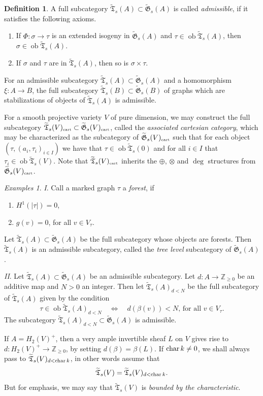 \documentclass[11pt]{amsart}
\theoremstyle{definition}
\newtheorem{defn}[prop]{Definition}
\theoremstyle{remark}
\newtheorem{examples}{Examples}\renewcommand{\theexamples}{}
\renewcommand{\tilde}{\widetilde}
\newcommand{\cart}{{\mbox{\tiny cart}}}
\newcommand{\TT}{{\mathfrak{T}}}
\newcommand{\GG}{{\mathfrak{G}}}
\newcommand{\zz}{{\mathbb{Z}}}
\newcommand{\ob}{\operatorname{ob}}
\newcommand{\chr}{\operatorname{\rm char}\nolimits}
\renewcommand{\t}{_{\tau}}
\theoremstyle{plain}
\theoremstyle{definition}
\theoremstyle{remark}
\begin{document}
\begin{defn} \label{doasvg}
A full subcategory \(\tilde{\TT}_s(A)\subset\tilde{\GG}_s(A)\) is called {\em
admissible}, if it satisfies the following
axioms.
\begin{enumerate}
\item If \(\Phi:\sigma\rightarrow\tau\) is an extended isogeny in
\(\tilde{\GG}_s(A)\) and \(\tau\in \ob\tilde{\TT}_s(A)\),
then \(\sigma\in\ob\tilde{\TT}_s(A)\).
\item If \(\sigma\) and \(\tau\) are in \(\tilde{\TT}_s(A)\), then so is
\(\sigma\times\tau\).
\end{enumerate}
\end{defn}

For an admissible subcategory \(\tilde{\TT}_s(A)\subset\tilde{\GG}_s(A)\) and a
homomorphism \(\xi:A\rightarrow B\), the
full subcategory \(\tilde{\TT}_s(B)\subset\tilde{\GG}_s(B)\) of graphs which are
stabilizations of objects of
\(\tilde{\TT}_s(A)\) is admissible.

For a smooth projective variety \(V\) of pure dimension, we may construct the
full subcategory
\(\tilde{\TT}_s(V)_\cart\subset\tilde{\GG}_s(V)_\cart\), called the {\em
associated cartesian category}, which may be
characterized as the subcategory of \(\tilde{\GG}_s(V)_\cart\) such that for each
object \((\tau,(a_i,\tau_i)_{i\in I})\) we
have that \(\tau\in\ob\tilde{\TT}_s(0)\) and for all \(i\in I\) that
\(\tau_i\in\ob\tilde{\TT}_s(V)\). Note that
\(\tilde{\TT}_s(V)_\cart\) inherits the \(\oplus\), \(\otimes\) and \(\deg\) structures
from \(\tilde{\GG}_s(V)_\cart\).

\begin{examples}
{\em I}. Call a marked graph \(\tau\) a {\em forest}, if
\begin{enumerate}
\item \(H^1(|\tau|)=0\),
\item \(g(v)=0\), for all \(v\in V\t\).
\end{enumerate}
Let \(\tilde{\TT}_s(A)\subset\tilde{\GG}_s(A)\) be the full subcategory whose
objects are forests. Then \(\tilde{\TT}_s(A)\)
is an admissible subcategory, called the {\em tree level }subcategory of
\(\tilde{\GG}_s(A)\).

{\em II}. Let \(\tilde{\TT}_s(A)\subset\tilde{\GG}_s(A)\) be an admissible
subcategory. Let \(d:A\rightarrow\zz_{\geq0}\) be
an additive map and \(N>0\) an integer. Then let \(\tilde{\TT}_s(A)_{d<N}\) be the
full subcategory of \(\tilde{\TT}_s(A)\)
given by the condition
\[
\tau\in\ob\tilde{\TT}_s(A)_{d<N}\quad \Longleftrightarrow\quad
\mbox{\(d(\beta(v))<N\),  for all \(v\in V\t\)}.
\]
The subcategory \(\tilde{\TT}_s(A)_{d<N}\subset\tilde{\GG}_s(A)\) is admissible.

If \(A=H_2(V)^+\), then a very ample invertible sheaf \(L\) on \(V\) gives rise to
\(d:H_2(V)^+\rightarrow\zz_{\geq0}\), by
setting \(d(\beta)=\beta(L)\). If \(\chr k\not=0\), we shall always pass to
\(\tilde{\TT}_s(V)_{d<\chr k}\), in other words
assume that
\[
\tilde{\TT}_s(V)=\tilde{\TT}_s(V)_{d<\chr k}.
\]
But for emphasis, we may say that \(\tilde{\TT}_s(V)\) is {\em bounded by the
characteristic}.
\end{examples}
\end{document}
